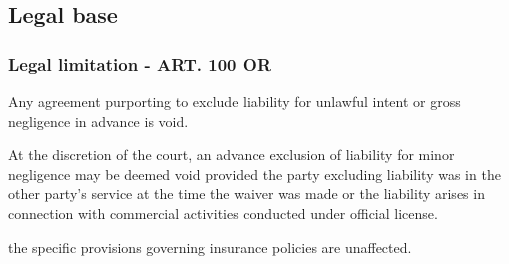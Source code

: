 \subsection{Legal base}
\subsubsection{Legal limitation - ART. 100 OR}
\begin{compactenum}
	\item Any agreement purporting to exclude liability for unlawful intent	or gross negligence in advance is void.
	\item At the discretion of the court, an advance exclusion of liability for	minor negligence may be deemed void provided the party excluding liability was in the other party’s service at the time the	waiver was made or the liability arises in connection with commercial activities conducted under official license.
	\item the specific provisions governing insurance policies are unaffected.
\end{compactenum}